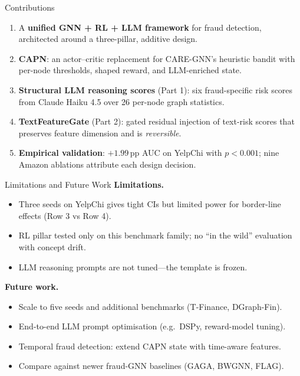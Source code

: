\documentclass[aspectratio=169,10pt]{beamer}
\begin{document}
\begin{frame}{Contributions}
    \begin{enumerate}
        \item A \textbf{unified GNN + RL + LLM framework} for fraud detection,
              architected around a three-pillar, additive design.
        \item \textbf{CAPN}: an actor--critic replacement for CARE-GNN's heuristic
              bandit with per-node thresholds, shaped reward, and LLM-enriched state.
        \item \textbf{Structural LLM reasoning scores} (Part 1): six fraud-specific
              risk scores from Claude Haiku 4.5 over 26 per-node graph statistics.
        \item \textbf{TextFeatureGate} (Part 2): gated residual injection of text-risk
              scores that preserves feature dimension and is \emph{reversible}.
        \item \textbf{Empirical validation}: $+1.99$\,pp AUC on YelpChi with
              $p < 0.001$; nine Amazon ablations attribute each design decision.
    \end{enumerate}
\end{frame}

\begin{frame}{Limitations and Future Work}
    \textbf{Limitations.}
    \begin{itemize}
        \item Three seeds on YelpChi gives tight CIs but limited power for
              border-line effects (Row 3 vs Row 4).
        \item RL pillar tested only on this benchmark family; no ``in the wild''
              evaluation with concept drift.
        \item LLM reasoning prompts are not tuned---the template is frozen.
    \end{itemize}
    \vspace{0.4em}
    \textbf{Future work.}
    \begin{itemize}
        \item Scale to five seeds and additional benchmarks (T-Finance, DGraph-Fin).
        \item End-to-end LLM prompt optimisation (e.g.\ DSPy, reward-model tuning).
        \item Temporal fraud detection: extend CAPN state with time-aware features.
        \item Compare against newer fraud-GNN baselines (GAGA, BWGNN, FLAG).
    \end{itemize}
\end{frame}
\end{document}
